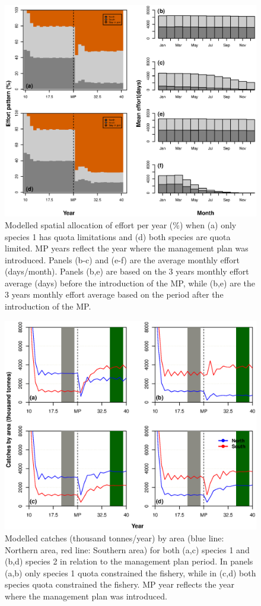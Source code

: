 \documentclass[12pt,oneline,a4paper,numbib]{ouparticle}
\numberwithin{equation}{subsection} %
\begin{document}
\begin{figure}[!ht]
\centering
\includegraphics[width=\textwidth]{Figures/Effort.eps} 
\caption{Modelled spatial allocation of effort per year (\%) when (a) only species 1 has quota limitations and (d) both species are quota limited.  MP years reflect the year where the management plan was introduced. Panels (b-c) and (e-f) are the average monthly effort (days/month). Panels (b,e) are based on the 3 years monthly effort average (days) before the introduction of the MP, while (b,e) are the 3 years monthly effort average based on the period after the introduction of the MP.}
\end{figure}

\begin{figure}[!ht]
\centering
\includegraphics[width=\textwidth]{Figures/Catchesbyarea.eps} 
\caption{Modelled catches (thousand tonnes/year) by area (blue line: Northern area, red line: Southern area) for both (a,c) species 1 and (b,d) species 2 in relation to the management plan period. In panels (a,b) only species 1 quota constrained the fishery, while in (c,d) both species quota constrained the fishery. MP year reflects the year where the management plan was introduced.}
\end{figure} 
\end{document}
